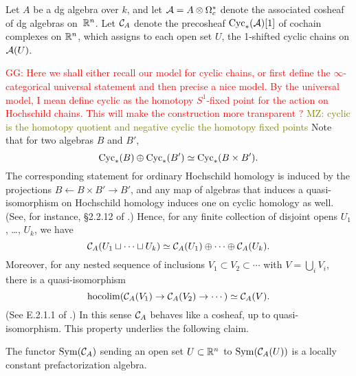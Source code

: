 \documentclass[11pt]{amsart}
\numberwithin{equation}{section}
\def\owen{\textcolor{magenta}{OG: }\textcolor{magenta}}
\def\mahmoud{\textcolor{olive}{MZ: }\textcolor{olive}}
\def\greg{\textcolor{red}{GG: }\textcolor{red}}
\begin{document}
\begin{dfn}\label{dfn: CA}
Let $A$ be a dg algebra over $k$, and let $\mathcal A = A \otimes \Omega^*_c$ denote the associated cosheaf of dg algebras on~$\mathbb R^n$.
Let $\mathcal C_A$ denote the precosheaf ${\rm Cyc}_*(\mathcal A)[1]$ of cochain complexes on $\mathbb R^n$,
which assigns to each open set $U$, the 1-shifted cyclic chains on $\mathcal A(U)$.
\end{dfn}
\greg{Here we shall either recall our model for cyclic chains, or first define the $\infty$-categorical universal statement and then precise a nice model. By the universal model, I mean define cyclic as the homotopy $S^1$-fixed point for the action on Hochschild chains. This will make the construction more transparent ?}
\mahmoud{cyclic is the homotopy quotient and negative cyclic the homotopy fixed points}
Note that for two algebras $B$ and $B'$,
\[
{\rm Cyc}_*(B) \oplus {\rm Cyc}_*(B') \simeq {\rm Cyc}_*(B \times B') .
\] 
The corresponding statement for ordinary Hochschild homology is induced by the projections $B \leftarrow B \times B' \to B'$, and any map of algebras that induces a quasi-isomorphism on Hochschild homology induces one on cyclic homology as well.
(See, for instance, \S2.2.12 of \cite{LodayCyclic}.)
Hence, for any finite collection of disjoint opens $U_1$, \dots, $U_k$, 
we have
\[
\mathcal C_A(U_1 \sqcup \cdots \sqcup U_k) \simeq \mathcal C_A(U_1) \oplus \cdots \oplus \mathcal C_A(U_k).
\]
Moreover, for any nested sequence of inclusions $V_1 \subset V_2 \subset \cdots$ with $V = \bigcup_i V_i$,
there is a quasi-isomorphism
\[
{\rm hocolim}(\mathcal C_A(V_1) \to \mathcal C_A(V_2) \to \cdots) \simeq \mathcal C_A(V).
\]
(See E.2.1.1 of \cite{LodayCyclic}.)
In this sense $\mathcal C_A$ behaves like a cosheaf, up to quasi-isomorphism. 
This property underlies the following claim.

\begin{lmm}
\label{lem: cycfact}
The functor ${\rm Sym}(\mathcal C_A)$ sending an open set $U \subset \mathbb R^n$ to ${\rm Sym}(\mathcal C_A(U))$ is a locally constant prefactorization algebra.
\end{lmm}

\end{document}
